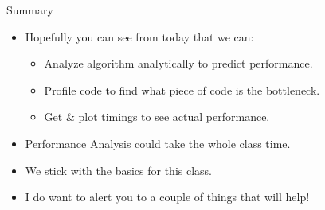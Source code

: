 \documentclass{beamer}
\begin{document}
\begin{frame}{Summary}
\begin{itemize}
\item Hopefully you can see from today that we can:
\begin{itemize}
\item Analyze algorithm analytically to predict performance.
\item Profile code to find what piece of code is the bottleneck.
\item Get \& plot timings to see actual performance.
\end{itemize}
\item Performance Analysis could take the whole class time.
\item We stick with the basics for this class.
\item I do want to alert you to a couple of things that will help!
\end{itemize}
\end{frame}
\end{document}
